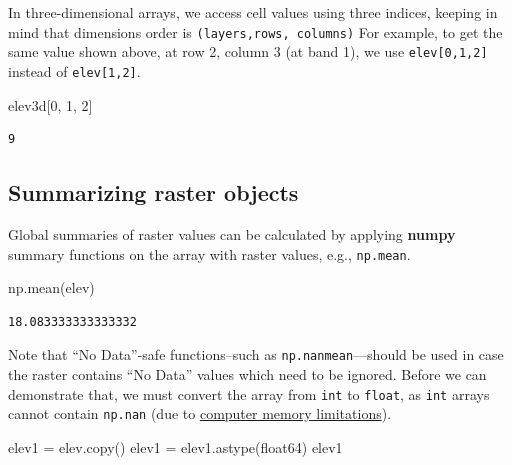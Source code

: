 \documentclass[
  letterpaper,
]{krantz}
\newenvironment{Shaded}{\begin{snugshade}}{\end{snugshade}}
\newcommand{\DecValTok}[1]{\textcolor[rgb]{0.68,0.00,0.00}{#1}}
\newcommand{\NormalTok}[1]{\textcolor[rgb]{0.00,0.23,0.31}{#1}}
\newcommand{\OperatorTok}[1]{\textcolor[rgb]{0.37,0.37,0.37}{#1}}
\newcommand{\StringTok}[1]{\textcolor[rgb]{0.13,0.47,0.30}{#1}}
\begin{document}
In three-dimensional arrays, we access cell values using three indices,
keeping in mind that dimensions order is
\texttt{(layers,rows,\ columns)} For example, to get the same value
shown above, at row 2, column 3 (at band 1), we use
\texttt{elev{[}0,1,2{]}} instead of \texttt{elev{[}1,2{]}}.

\begin{Shaded}
\begin{Highlighting}[]
\NormalTok{elev3d[}\DecValTok{0}\NormalTok{, }\DecValTok{1}\NormalTok{, }\DecValTok{2}\NormalTok{] }
\end{Highlighting}
\end{Shaded}

\begin{verbatim}
9
\end{verbatim}

\subsection{Summarizing raster
objects}\label{sec-summarizing-raster-objects}

Global summaries of raster values can be calculated by applying
\textbf{numpy} summary functions on the array with raster values, e.g.,
\texttt{np.mean}.

\begin{Shaded}
\begin{Highlighting}[]
\NormalTok{np.mean(elev)}
\end{Highlighting}
\end{Shaded}

\begin{verbatim}
18.083333333333332
\end{verbatim}

Note that ``No Data''-safe functions--such as
\texttt{np.nanmean}---should be used in case the raster contains ``No
Data'' values which need to be ignored. Before we can demonstrate that,
we must convert the array from \texttt{int} to \texttt{float}, as
\texttt{int} arrays cannot contain \texttt{np.nan} (due to
\href{https://en.wikipedia.org/wiki/NaN\#Integer_NaN}{computer memory
limitations}).

\begin{Shaded}
\begin{Highlighting}[]
\NormalTok{elev1 }\OperatorTok{=}\NormalTok{ elev.copy()}
\NormalTok{elev1 }\OperatorTok{=}\NormalTok{ elev1.astype(}\StringTok{\textquotesingle{}float64\textquotesingle{}}\NormalTok{)}
\NormalTok{elev1}
\end{Highlighting}
\end{Shaded}
\end{document}
